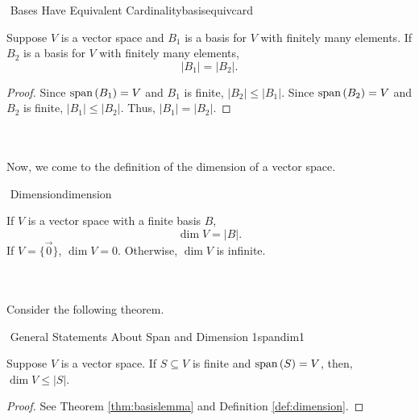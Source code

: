         \pagebreak
        \begin{theorem}{\Stop\,\,Bases Have Equivalent Cardinality}{basisequivcard}

            Suppose \(V\) is a vector space and \(B_1\) is a basis for \(V\) with finitely many elements. If \(B_2\) is a basis for \(V\) with finitely many elements,
            \begin{equation*}
                |B_1|=|B_2|.
            \end{equation*}
            \begin{proof}
                Since \(\text{span\,}(B_1)=V\) and \(B_1\) is finite, \(|B_2|\leq|B_1|\). Since \(\text{span\,}(B_2)=V\) and \(B_2\) is finite, \(|B_1|\leq|B_2|\). Thus, \(|B_1|=|B_2|\).
            \end{proof}
            
        \end{theorem}
        \vphantom
        \\
        \\
        Now, we come to the definition of the dimension of a vector space.
        \begin{definition}{\Stop\,\,Dimension}{dimension}

            If \(V\) is a vector space with a finite basis \(B\),
            \begin{equation*}
                \dim V = |B|.
            \end{equation*}
            If \(V=\{\vec{0}\}\), \(\dim V=0\). Otherwise, \(\dim V\) is infinite.
            
        \end{definition}
        \vphantom
        \\
        \\
        Consider the following theorem.
        \begin{theorem}{\Stop\,\,General Statements About Span and Dimension 1}{spandim1}
            
            Suppose \(V\) is a vector space. If \(S\subseteq V\) is finite and \(\text{span\,}(S)=V\), then, \(\dim V\leq|S|\).
            \begin{proof}
                See Theorem \ref{thm:basislemma} and Definition \ref{def:dimension}.
            \end{proof}

        \end{theorem}
